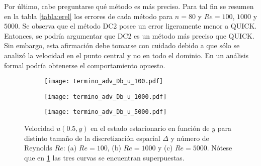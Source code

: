 \documentclass[aps,prb,twocolumn,superscriptaddress,floatfix,longbibliography,10pt]{revtex4-2}
\newcounter{para}
\begin{document}
Por último, cabe preguntarse qué método es más preciso. Para tal fin se resumen en la tabla \ref{tabla:erel} los errores de cada método para $n = 80$ y $Re = 100$, $1000$ y $5000$. Se observa que el método DC2 posee un error ligeramente menor a QUICK. Entonces, se podría argumentar que DC2 es un método más preciso que QUICK. Sin embargo, esta afirmación debe tomarse con cuidado debido a que sólo se analizó la velocidad en el punto central y no en todo el dominio. En un análisis formal podría obtenerse el comportamiento opuesto.







\begin{figure}
  \centering
  \begin{subfigure}[b]{0.32\textwidth}
      \centering
      \texttt{[image: termino\_adv\_Db\_u\_100.pdf]}
      \caption{}
      \label{fig:termino_adv_Db_u_100}
  \end{subfigure}
  \hfill
  \begin{subfigure}[b]{0.32\textwidth}
      \centering
      \texttt{[image: termino\_adv\_Db\_u\_1000.pdf]}
      \caption{}
      \label{fig:termino_adv_Db_u_1000}
  \end{subfigure}
  \hfill
  \begin{subfigure}[b]{0.32\textwidth}
      \centering
      \texttt{[image: termino\_adv\_Db\_u\_5000.pdf]}
      \caption{}
      \label{fig:termino_adv_Db_u_5000}
  \end{subfigure}
     \caption{Velocidad $u(0.5,y)$ en el estado estacionario en función de $y$ para distinto tamaño de la discretización espacial $\Delta$ y número de Reynolds $Re$: (a) $Re = 100$, (b) $Re = 1000$ y (c) $Re = 5000$. Nótese que en \ref{fig:termino_adv_Db_u_100} las tres curvas se encuentran superpuestas.}
     \label{fig:velocidades_u_DC2_vs_Re}
\end{figure}
\end{document}
